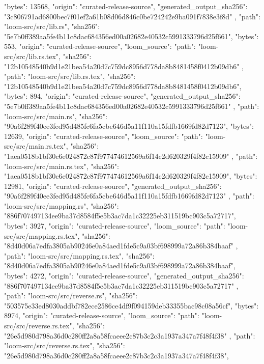 {{      "bytes": 13568,
      "origin": "curated-release-source",
      "generated_output_sha256": "3c806791ad6800bec7f01ef2a61b08d06d846c0be724242e9ba091f7838e3f8d"
    },
    {
      "path": "loom-src/src/lib.rs",
      "sha256": "5e7b0ff389aa5fe4b11c8dac684356ed00a02682e40532c5991333796d25f661",
      "bytes": 553,
      "origin": "curated-release-source",
      "loom_source": {
        "path": "loom-src/src/lib.rs.tex",
        "sha256": "12b10548540b9d1e21bea54a20d7c759dc8956d778da8b8481458f0412b09db6"
      }
    },
    {
      "path": "loom-src/src/lib.rs.tex",
      "sha256": "12b10548540b9d1e21bea54a20d7c759dc8956d778da8b8481458f0412b09db6",
      "bytes": 894,
      "origin": "curated-release-source",
      "generated_output_sha256": "5e7b0ff389aa5fe4b11c8dac684356ed00a02682e40532c5991333796d25f661"
    },
    {
      "path": "loom-src/src/main.rs",
      "sha256": "90a6f289f40ee3fed95d485fc6fa5cbe646d5a11f110a15fdfb1669fd82d7123",
      "bytes": 12639,
      "origin": "curated-release-source",
      "loom_source": {
        "path": "loom-src/src/main.rs.tex",
        "sha256": "1aea0518b1bf30c6e024872c87f977474612569a6f14c2d620329f4f82c15909"
      }
    },
    {
      "path": "loom-src/src/main.rs.tex",
      "sha256": "1aea0518b1bf30c6e024872c87f977474612569a6f14c2d620329f4f82c15909",
      "bytes": 12981,
      "origin": "curated-release-source",
      "generated_output_sha256": "90a6f289f40ee3fed95d485fc6fa5cbe646d5a11f110a15fdfb1669fd82d7123"
    },
    {
      "path": "loom-src/src/mapping.rs",
      "sha256": "886f707497134ee9ba37d8584f5e5b3ac7da1c32225eb311519bc903c5a72717",
      "bytes": 3927,
      "origin": "curated-release-source",
      "loom_source": {
        "path": "loom-src/src/mapping.rs.tex",
        "sha256": "8d40d06a7edfa3805ab90246e0a84aed1fde5c9a03bf698999a72a86b384baaf"
      }
    },
    {
      "path": "loom-src/src/mapping.rs.tex",
      "sha256": "8d40d06a7edfa3805ab90246e0a84aed1fde5c9a03bf698999a72a86b384baaf",
      "bytes": 4272,
      "origin": "curated-release-source",
      "generated_output_sha256": "886f707497134ee9ba37d8584f5e5b3ac7da1c32225eb311519bc903c5a72717"
    },
    {
      "path": "loom-src/src/reverse.rs",
      "sha256": "503575e33ed8030addbf782ece2586ce4df9f094159deb33355bac98c08a56cf",
      "bytes": 8974,
      "origin": "curated-release-source",
      "loom_source": {
        "path": "loom-src/src/reverse.rs.tex",
        "sha256": "26e5d980d798a36d0c280ff2a8a58fcaeee2c87b3c2c3a1937a347a7f48f4f38"
      }
    },
    {
      "path": "loom-src/src/reverse.rs.tex",
      "sha256": "26e5d980d798a36d0c280ff2a8a58fcaeee2c87b3c2c3a1937a347a7f48f4f38",
}}
